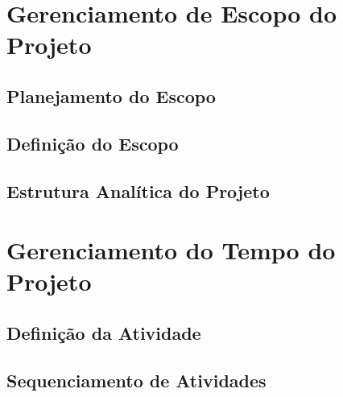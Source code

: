 \chapter{Gerenciamento de Escopo do Projeto}



    \section{Planejamento do Escopo}



    \section{Definição do Escopo}



    \section{Estrutura Analítica do Projeto}



\chapter{Gerenciamento do Tempo do Projeto}



    \section{Definição da Atividade}



    \section{Sequenciamento de Atividades}



